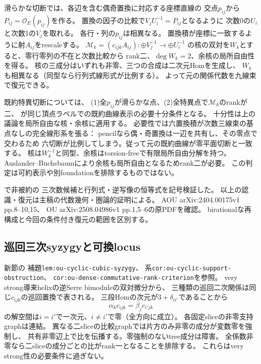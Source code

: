 \documentclass[11pt,a4paper]{ltjsarticle}
\begin{document}
滑らかな切断では、各辺を含む偶奇置換に対応する座標直線の
交点$p_{ij}$から$P_{ij}=\mathcal O_E(p_{ij})$を作る。
置換の因子の比較で$V_jU_i^{-1}=P_{ij}$となるように
次数0の$U_i$と次数1の$V_j$を取れる。
各行・列の$p_{ij}$は相異なる。
置換積が座標に一致するように射$A_{ij}$をrescaleする。
$\mathscr M_k=(c_{ijk}A_{ij}):\oplus V_j^{-1}\to\oplus U_i^{-1}$
の核の双対を$W_k$とすると、零行零列の不在と次数比較から
rank二、$\deg W_k=2$、余核の局所自由性を得る。
核の三成分はいずれも非零、三つの合成は二次元Homを生成し、
$W_k$も相異なる（同型なら行列式線形式が比例する）。
よって元の関係代数を九線束で復元できる。

既約特異切断については、
(1)全$p_{ij}$が滑らかな点、(2)全特異点で$\mathscr M_k$のrankが二、
が同じ頂点ラベルでの既約曲線表示の必要十分条件となる。
十分性は上の議論を局所自由な核・余核に適用する。
必要性では六置換積が次数三線束の基点なしの完全線形系を張る：
pencilなら偶・奇置換は一辺を共有し、その零点で交わるため
六切断が比例してしまう。従って元の既約曲線が零平面切断と一致する。
核は$W_k^{-1}$と同型、余核はtorsion-freeで有限局所自由分解を持つ。
Auslander--Buchsbaumにより余核も局所自由となるためrank二が必要。
この判定は可約表示や別foundationを排除するものではない。

で非被約の
三次数候補と行列式・逆写像の恒等式を記号検証した。
以上の認識・復元は主稿の代数幾何・圏論的証明による。
AOU arXiv:2404.00175v1 pp.8--10,15、
OU arXiv:2508.04986v1 pp.1,5--6の原PDFを確認。
birationalな再構成と今回の条件付き復元の範囲を区別する。

\subsection*{巡回三次syzygyと可換locus}
新節の
補題\texttt{lem:ou-cyclic-cubic-syzygy}、
系\texttt{cor:ou-cyclic-support-obstruction}、
\texttt{cor:ou-dense-commutative-rank-criterion}を参照。
very strong導来helixの逆Serre bimoduleの双対微分から、
三種類の巡回二次関係は同じ$c_{ijk}$の巡回置換で表される。
三段Homの次元が$3+\delta_{ii'}$であることから
\[
 \alpha_k c_{ijk}=\beta_j c_{i'jk}
\]
の解空間は$i=i'$で一次元、$i\ne i'$で零（全方向に成立）。
各固定sliceの非零支持graphは連結。
異なる二sliceの比較graphでは片方のみ非零の成分が変数零を強制し、
共有非零辺上で比を伝播する。零強制のないtree成分は障害。
全係数非零なら二sliceの成分ごとの比がrank一となることを排除する。
これらはvery strong性の必要条件に過ぎない。
\end{document}
